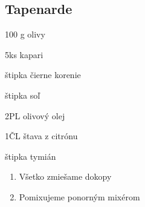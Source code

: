 \setcounter{step}{0}
\subsection{Tapenarde}

\begin{ingredient}
\def\portions{4}%

\begin{main}
	\item 100 g olivy 
	\item 5ks kapari
	\item štipka čierne korenie
	\item štipka soľ
	\item 2PL olivový olej
	\item 1ČL štava z citrónu
	\item štipka tymián
\end{main}
\end{ingredient}
\begin{recipe}

\begin{enumerate}


\item{Všetko zmiešame dokopy}
\item{Pomixujeme ponorným mixérom}

\end{enumerate}
\end{recipe}

\begin{notes}

\end{notes}
\clearpage	
